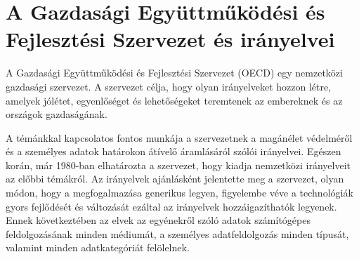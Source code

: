 \section{A Gazdasági Együttműködési és Fejlesztési Szervezet és irányelvei} \label{OECD-section}

A Gazdasági Együttműködési és Fejlesztési Szervezet (OECD) egy nemzetközi gazdasági szervezet. A szervezet célja, hogy olyan irányelveket hozzon létre, amelyek jólétet, egyenlőséget és lehetőségeket teremtenek az embereknek és az országok gazdaságának.

A témánkkal kapcsolatos fontos munkája a szervezetnek a magánélet védelméről és a személyes adatok határokon átívelő áramlásáról szólói irányelvei. Egészen korán, már 1980-ban elhatározta a szervezet, hogy kiadja nemzetközi irányelveit az előbbi témákról. Az irányelvek ajánlásként jelentette meg a szervezet, olyan módon, hogy a megfogalmazása generikus legyen, figyelembe véve a technológiák gyors fejlődését és változását ezáltal az irányelvek hozzáigazíthatók legyenek. Ennek következtében az elvek az egyénekről szóló adatok számítógépes feldolgozásának minden médiumát, a személyes adatfeldolgozás minden típusát, valamint minden adatkategóriát felölelnek.

